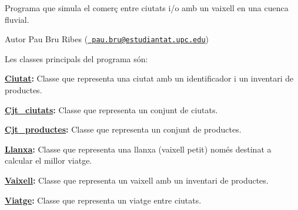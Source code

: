 Programa que simula el comerç entre ciutats i/o amb un vaixell en una cuenca fluvial.\begin{DoxyAuthor}{Autor}
Pau Bru Ribes (\href{mailto:pau.bru@estudiantat.upc.edu}{\texttt{ pau.\+bru@estudiantat.\+upc.\+edu}})
\end{DoxyAuthor}
Les classes principals del programa són\+:
\begin{DoxyItemize}
\item {\bfseries{\mbox{\hyperlink{classCiutat}{Ciutat}}\+:}} Classe que representa una ciutat amb un identificador i un inventari de productes.
\item {\bfseries{\mbox{\hyperlink{classCjt__ciutats}{Cjt\+\_\+ciutats}}\+:}} Classe que representa un conjunt de ciutats.
\item {\bfseries{\mbox{\hyperlink{classCjt__productes}{Cjt\+\_\+productes}}\+:}} Classe que representa un conjunt de productes.
\item {\bfseries{\mbox{\hyperlink{classLlanxa}{Llanxa}}\+:}} Classe que representa una llanxa (vaixell petit) només destinat a calcular el millor viatge.
\item {\bfseries{\mbox{\hyperlink{classVaixell}{Vaixell}}\+:}} Classe que representa un vaixell amb un inventari de productes.
\item {\bfseries{\mbox{\hyperlink{classViatge}{Viatge}}\+:}} Classe que representa un viatge entre ciutats. 
\end{DoxyItemize}